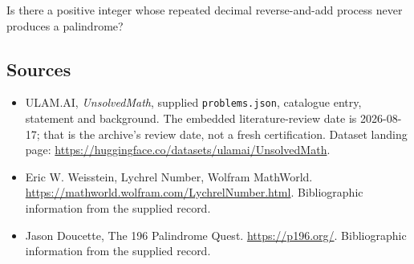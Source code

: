 \documentclass[11pt,a4paper]{article}
\begin{document}
Is there a positive integer whose repeated decimal reverse-and-add process never produces a palindrome?

\subsection{Sources}

{\small

\begin{itemize}

\item[\hypertarget{source:statement:1}{S1}] ULAM.AI, \emph{UnsolvedMath}, supplied \texttt{problems.json}, catalogue entry, statement and background. The embedded literature-review date is 2026-08-17; that is the archive’s review date, not a fresh certification. Dataset landing page: \url{https://huggingface.co/datasets/ulamai/UnsolvedMath}.

\item[\hypertarget{source:statement:2}{S2}] Eric W. Weisstein, Lychrel Number, Wolfram MathWorld. \url{https://mathworld.wolfram.com/LychrelNumber.html}. Bibliographic information from the supplied record.

\item[\hypertarget{source:statement:3}{S3}] Jason Doucette, The 196 Palindrome Quest. \url{https://p196.org/}. Bibliographic information from the supplied record.

\end{itemize}

}

\label{end:statement}
\end{document}
